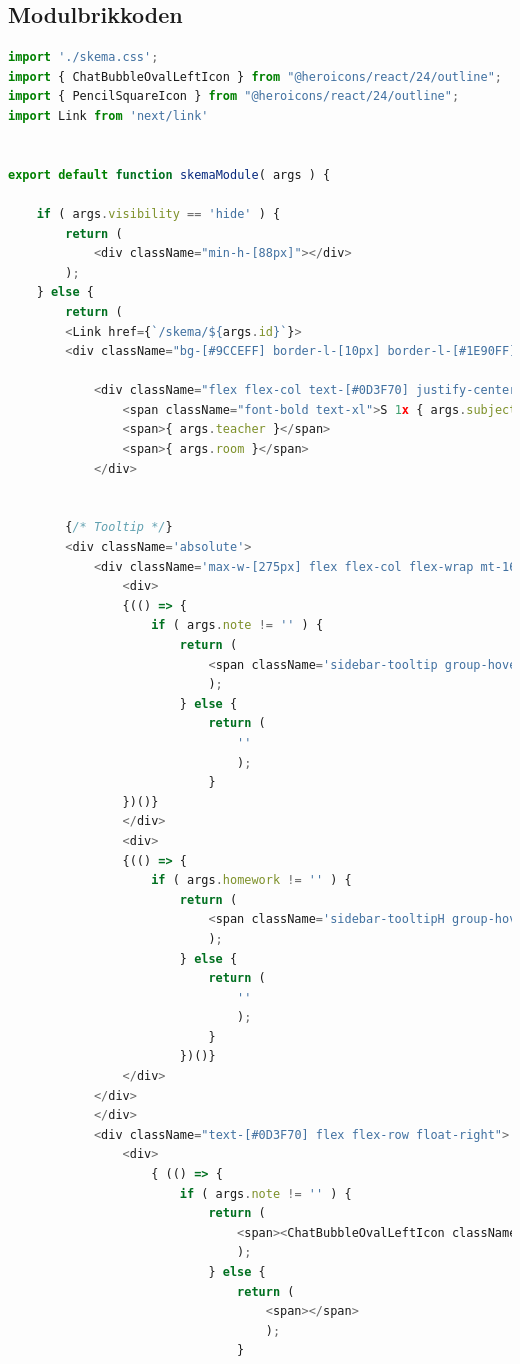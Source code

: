 \documentclass[12pt, a4paper]{article}
\begin{document}
\begin{appendices}
        \section{Modulbrikkoden \label{appendix:modulbrikkode}} \newpage
        \renewcommand*{\thepage}{D\arabic{page}}
        \begin{lstlisting}[language=Javascript]
import './skema.css';
import { ChatBubbleOvalLeftIcon } from "@heroicons/react/24/outline";
import { PencilSquareIcon } from "@heroicons/react/24/outline";
import Link from 'next/link'


export default function skemaModule( args ) {

    if ( args.visibility == 'hide' ) {
        return (
            <div className="min-h-[88px]"></div>
        );
    } else {
        return (
        <Link href={`/skema/${args.id}`}>
        <div className="bg-[#9CCEFF] border-l-[10px] border-l-[#1E90FF] p-4 rounded-lg max-w-[275px] max-h-[88px] flex justify-between cursor-pointer hover:opacity-80 group">
            
            <div className="flex flex-col text-[#0D3F70] justify-center">
                <span className="font-bold text-xl">S 1x { args.subject }</span>
                <span>{ args.teacher }</span>
                <span>{ args.room }</span>
            </div>


        {/* Tooltip */}
        <div className='absolute'>
            <div className='max-w-[275px] flex flex-col flex-wrap mt-16'>
                <div>
                {(() => {
                    if ( args.note != '' ) {
                        return (
                            <span className='sidebar-tooltip group-hover:scale-100 relative left-[-30px]'><h1 className='font-black'>Note:</h1>&nbsp;<span>{ args.note }</span></span>
                            );
                        } else {
                            return (
                                ''
                                );
                            }
                })()} 
                </div>
                <div>
                {(() => {
                    if ( args.homework != '' ) {
                        return (
                            <span className='sidebar-tooltipH group-hover:scale-100 relative left-[-30px]'><h1 className='font-black'>Lektier:</h1>&nbsp;<span>{ args.homework }</span> </span>
                            );
                        } else {
                            return (
                                ''
                                );
                            }
                        })()} 
                </div>
            </div>
            </div>
            <div className="text-[#0D3F70] flex flex-row float-right">
                <div>
                    { (() => {
                        if ( args.note != '' ) {
                            return (
                                <span><ChatBubbleOvalLeftIcon className="h-5"/></span>
                                );
                            } else {
                                return (
                                    <span></span>
                                    );
                                }
                                

\end{lstlisting}
\end{appendices}
\end{document}
